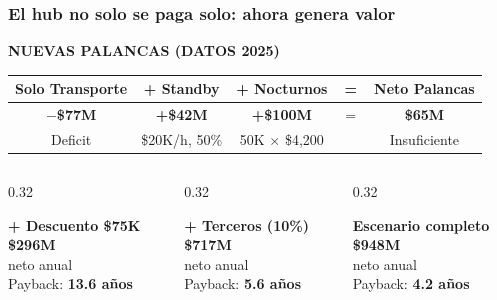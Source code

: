 \documentclass[aspectratio=169, 10pt]{beamer}
\newcommand{\tagline}[2]{{\scriptsize\color{#1}\textbf{\MakeUppercase{#2}}}}
\begin{document}
\begin{frame}
\frametitle{El hub no solo se paga solo: ahora genera valor}
\tagline{verde}{Nuevas Palancas (Datos 2025)}
\vspace{-2pt}

\begin{center}
\scriptsize
\renewcommand{\arraystretch}{1.2}
\begin{tabular}{c c c c c}
    \toprule
    \textbf{Solo Transporte} & \textbf{+ Standby} & \textbf{+ Nocturnos} & \textbf{=} & \textbf{Neto Palancas} \\
    \midrule
    \textcolor{rojo}{\textbf{$-$\$77M}} & \textcolor{cian}{\textbf{+\$42M}} & \textcolor{cian}{\textbf{+\$100M}} & $=$ & \textcolor{amarillo}{\textbf{\$65M}} \\
    {\tiny Deficit} & {\tiny \$20K/h, 50\%} & {\tiny 50K $\times$ \$4,200} & & {\tiny Insuficiente} \\
    \bottomrule
\end{tabular}
\end{center}

\vspace{6pt}
\begin{columns}[T]
\begin{column}{0.32\textwidth}
\colorbox{amarilloclaro}{\parbox{\dimexpr\linewidth-8pt}{\centering\strut
\textcolor{amarillo}{\textbf{+ Descuento \$75K}}\\[2pt]
{\large\textcolor{amarillo}{\textbf{\$296M}}}\\
{\tiny neto anual}\\[2pt]
Payback: \textcolor{amarillo}{\textbf{13.6 a\~nos}}\strut}}
\end{column}
\begin{column}{0.32\textwidth}
\colorbox{verdeclaro}{\parbox{\dimexpr\linewidth-8pt}{\centering\strut
\textcolor{verde}{\textbf{+ Terceros (10\%)}}\\[2pt]
{\large\textcolor{verde}{\textbf{\$717M}}}\\
{\tiny neto anual}\\[2pt]
Payback: \textcolor{verde}{\textbf{5.6 a\~nos}}\strut}}
\end{column}
\begin{column}{0.32\textwidth}
\colorbox{verdeclaro}{\parbox{\dimexpr\linewidth-8pt}{\centering\strut
\textcolor{verde}{\textbf{Escenario completo}}\\[2pt]
{\large\textcolor{verde}{\textbf{\$948M}}}\\
{\tiny neto anual}\\[2pt]
Payback: \textcolor{verde}{\textbf{4.2 a\~nos}}\strut}}
\end{column}
\end{columns}


\end{frame}
\end{document}
